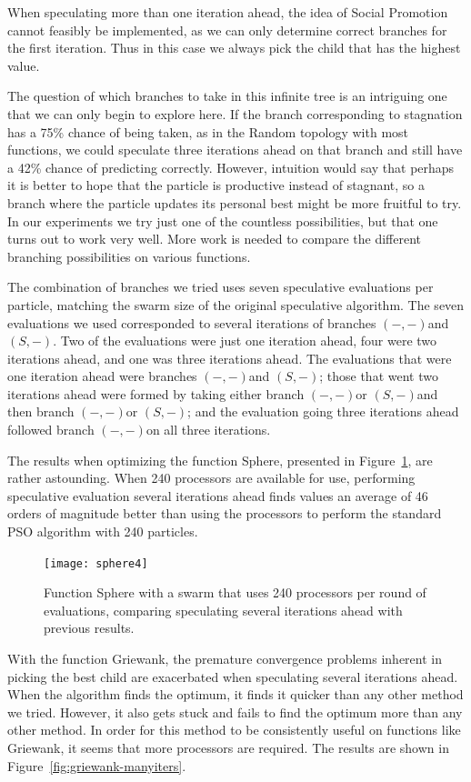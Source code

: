 \documentclass[journal,letterpaper]{IEEEtran}
\newcommand{\fig}[1]{Figure~\ref{fig:#1}}
\providecommand{\casexn}{\ensuremath{(S,-)}}
\providecommand{\casepn}{\ensuremath{(-,-)}}
\begin{document}
When speculating more than one iteration ahead, the idea of Social Promotion
cannot feasibly be implemented, as we can only determine correct branches for
the first iteration.  Thus in this case we always pick the child that has the
highest value.

The question of which branches to take in this infinite tree is an intriguing
one that we can only begin to explore here.  If the branch corresponding to
stagnation has a 75\% chance of being taken, as in the Random topology with
most functions, we could speculate three iterations ahead on that branch and
still have a 42\% chance of predicting correctly.  However, intuition would say
that perhaps it is better to hope that the particle is productive instead of
stagnant, so a branch where the particle updates its personal best might be
more fruitful to try.  In our experiments we try just one of the countless
possibilities, but that one turns out to work very well.  More work is needed
to compare the different branching possibilities on various functions.

The combination of branches we tried uses seven speculative evaluations per
particle, matching the swarm size of the original speculative algorithm.  The
seven evaluations we used corresponded to several iterations of branches
\casepn and \casexn.  Two of the evaluations were just one iteration ahead,
four were two iterations ahead, and one was three iterations ahead.  The
evaluations that were one iteration ahead were branches \casepn and \casexn;
those that went two iterations ahead were formed by taking either branch
\casepn or \casexn and then branch \casepn or \casexn; and the evaluation going
three iterations ahead followed branch \casepn on all three iterations.

The results when optimizing the function Sphere, presented in
\fig{sphere-manyiters}, are rather astounding.  When 240 processors are
available for use, performing speculative evaluation several iterations ahead
finds values an average of 46 orders of magnitude better than using the
processors to perform the standard PSO algorithm with 240 particles.

\begin{figure}
  \centering
  \texttt{[image: sphere4]}
  \caption{Function Sphere with a swarm that uses 240 processors per round of
  evaluations, comparing speculating several iterations ahead with previous
  results.}
  \label{fig:sphere-manyiters}
\end{figure}

With the function Griewank, the premature convergence problems inherent in
picking the best child are exacerbated when speculating several iterations
ahead.  When the algorithm finds the optimum, it finds it quicker than any
other method we tried.  However, it also gets stuck and fails to find the
optimum more than any other method.  In order for this method to be
consistently useful on functions like Griewank, it seems that more processors
are required.  The results are shown in \fig{griewank-manyiters}.
\end{document}
